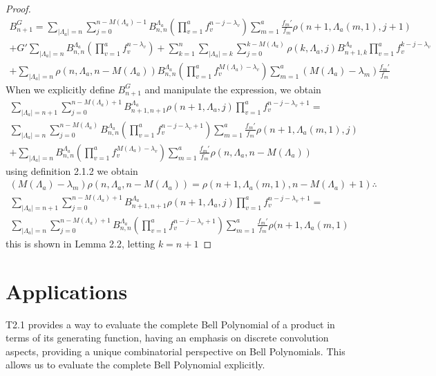 \documentclass[11pt]{article}
\theoremstyle{plain}
\theoremstyle{definition}
\begin{document}
\begin{proof}
\begin{align*}
    B_{n+1}^G = \sum_{|\Lambda_a|=n} \sum_{j=0}^{n-M(\Lambda_a)-1} B_{n,n}^{\Lambda_a}\left(\prod_{v=1}^a f_v^{n-j-\lambda_v}\right) \sum_{m=1}^a \frac{f_m'}{f_m} \rho(n+1,\Lambda_a(m,1),j+1)\\
    +G' \sum_{|\Lambda_a|=n}B_{n,n}^{\Lambda_a} \left(\prod_{v=1}^af_v^{n-\lambda_v}\right)
    +\sum_{k=1}^n \sum_{|\Lambda_a|=k} \sum_{j=0}^{k-M(\Lambda_a)}\rho(k,\Lambda_a,j)B_{n+1,k}^{\Lambda_a} \prod_{v=1}^a f_v^{k-j-\lambda_v}\\
    + \sum_{|\Lambda_a|=n} \rho(n,\Lambda_a,n-M(\Lambda_a))B_{n,n}^{\Lambda_a}\left(\prod_{v=1}^a f_v^{M(\Lambda_a)-\lambda_v}\right) \sum_{m=1}^a (M(\Lambda_a)-\lambda_m)\frac{f_m'}{f_m}
\end{align*}
When we explicitly define $B_{n+1}^G$ and manipulate the expression, we obtain
\begin{align*}
\sum_{|\Lambda_a|=n+1}\sum_{j=0}^{n-M(\Lambda_a)+1}B_{n+1,n+1}^{\Lambda_a} \rho(n+1,\Lambda_a,j) \prod_{v=1}^a f_v^{n-j-\lambda_v+1} = \\
\sum_{|\Lambda_a|=n} \sum_{j=0}^{n-M(\Lambda_a)}B_{n,n}^{\Lambda_a} \left(\prod_{v=1}^a f_v^{n-j-\lambda_v+1}\right) \sum_{m=1}^a \frac{f_m'}{f_m}\rho(n+1,\Lambda_a(m,1),j) \\
+\sum_{|\Lambda_a|=n} B_{n,n}^{\Lambda_a} \left(\prod_{v=1}^a f_v^{M(\Lambda_a)-\lambda_v}\right)\sum_{m=1}^a \frac{f_m'}{f_m} \rho(n,\Lambda_a,n-M(\Lambda_a))
\end{align*}
using definition 2.1.2 we obtain
\begin{align*}
    (M(\Lambda_a)-\lambda_m)\rho(n,\Lambda_a,n-M(\Lambda_a)) = \rho(n+1,\Lambda_a(m,1),n-M(\Lambda_a)+1) \therefore
\end{align*}
\begin{align*}
\sum_{|\Lambda_a|=n+1}\sum_{j=0}^{n-M(\Lambda_a)+1}B_{n+1,n+1}^{\Lambda_a} \rho(n+1,\Lambda_a,j) \prod_{v=1}^a f_v^{n-j-\lambda_v+1} =\\
\sum_{|\Lambda_a|=n}\sum_{j=0}^{n-M(\Lambda_a)+1} B_{n,n}^{\Lambda_a}\left(\prod_{v=1}^a f_v^{n-j-\lambda_v+1}\right)\sum_{m=1}^a \frac{f_m'}{f_m}\rho(n+1,\Lambda_a(m,1)
\end{align*}
this is shown in Lemma 2.2, letting $k=n+1$
\end{proof}
\section{Applications}
T2.1 provides a way to evaluate the complete Bell Polynomial of a product
in terms of its generating function, having an emphasis on discrete convolution
aspects, providing a unique combinatorial perspective on Bell Polynomials. This
allows us to evaluate the complete Bell Polynomial explicitly.
\end{document}
